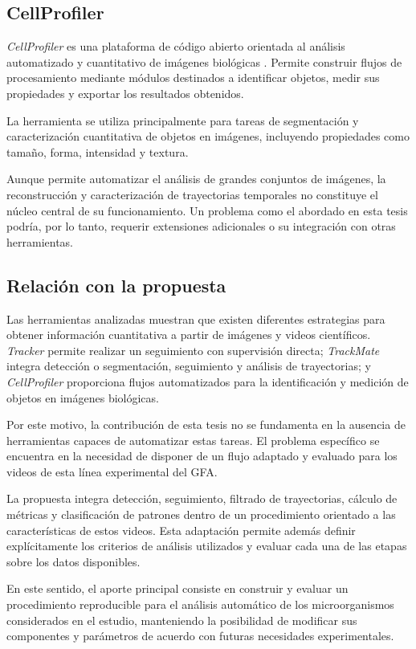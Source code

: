 \subsection{CellProfiler}

\textit{CellProfiler} es una plataforma de código abierto orientada al análisis automatizado y cuantitativo de imágenes biológicas \cite{carpenter2006}. Permite construir flujos de procesamiento mediante módulos destinados a identificar objetos, medir sus propiedades y exportar los resultados obtenidos.

La herramienta se utiliza principalmente para tareas de segmentación y caracterización cuantitativa de objetos en imágenes, incluyendo propiedades como tamaño, forma, intensidad y textura.

Aunque permite automatizar el análisis de grandes conjuntos de imágenes, la reconstrucción y caracterización de trayectorias temporales no constituye el núcleo central de su funcionamiento. Un problema como el abordado en esta tesis podría, por lo tanto, requerir extensiones adicionales o su integración con otras herramientas.

\subsection{Relación con la propuesta}

Las herramientas analizadas muestran que existen diferentes estrategias para obtener información cuantitativa a partir de imágenes y videos científicos. \textit{Tracker} permite realizar un seguimiento con supervisión directa; \textit{TrackMate} integra detección o segmentación, seguimiento y análisis de trayectorias; y \textit{CellProfiler} proporciona flujos automatizados para la identificación y medición de objetos en imágenes biológicas.

Por este motivo, la contribución de esta tesis no se fundamenta en la ausencia de herramientas capaces de automatizar estas tareas. El problema específico se encuentra en la necesidad de disponer de un flujo adaptado y evaluado para los videos de esta línea experimental del GFA.

La propuesta integra detección, seguimiento, filtrado de trayectorias, cálculo de métricas y clasificación de patrones dentro de un procedimiento orientado a las características de estos videos. Esta adaptación permite además definir explícitamente los criterios de análisis utilizados y evaluar cada una de las etapas sobre los datos disponibles.

En este sentido, el aporte principal consiste en construir y evaluar un procedimiento reproducible para el análisis automático de los microorganismos considerados en el estudio, manteniendo la posibilidad de modificar sus componentes y parámetros de acuerdo con futuras necesidades experimentales.

